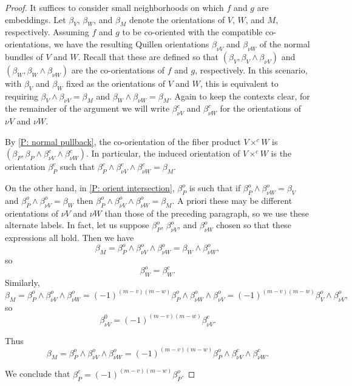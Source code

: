 \begin{proof}
	It suffices to consider small neighborhoods on which $f$ and $g$ are embeddings.
	Let $\beta_V$, $\beta_W$, and $\beta_M$ denote the orientations of $V$, $W$, and $M$, respectively.
	Assuming $f$ and $g$ to be co-oriented with the compatible co-orientations, we have the resulting Quillen orientations $\beta_{\nu V}$ and $\beta_{\nu W}$ of the normal bundles of $V$ and $W$.
	Recall that these are defined so that $(\beta_V,\beta_V \wedge \beta_{\nu V})$ and $(\beta_W,\beta_W \wedge \beta_{\nu W})$ are the co-orientations of $f$ and $g$, respectively.
	In this scenario, with $\beta_V$ and $\beta_W$ fixed as the orientations of $V$ and $W$, this is equivalent to requiring $\beta_V \wedge \beta_{\nu V} = \beta_M$ and $\beta_W \wedge \beta_{\nu W} = \beta_M$.
	Again to keep the contexts clear, for the remainder of the argument we will write $\beta^c_{\nu V}$ and $\beta^c_{\nu W}$ for the orientations of $\nu V$ and $\nu W$.

	By \cref{P: normal pullback}, the co-orientation of the fiber product $V\times^cW$ is $(\beta_P,\beta_P \wedge \beta^c_{\nu V} \wedge \beta^c_{\nu W})$.
	In particular, the induced orientation of $V\times^cW$ is the orientation $\beta_P^c$ such that $\beta_P^c \wedge \beta^c_{\nu V} \wedge \beta^c_{\nu W} = \beta_M$.

	On the other hand, in \cref{P: orient intersection}, $\beta^o_P$ is such that if $\beta^o_P \wedge \beta^o_{\nu W} = \beta_V$ and $\beta^o_P \wedge \beta^o_{\nu V} = \beta_W$ then $\beta^o_P \wedge \beta^o_{\nu V} \wedge \beta^o_{\nu W} = \beta_M.$ A priori these may be different orientations of $\nu V$ and $\nu W$ than those of the preceding paragraph, so we use these alternate labels.
	In fact, let us suppose $\beta^o_P$, $\beta^o_{\nu V}$, and $\beta^o_{\nu W}$ chosen so that these expressions all hold.
	Then we have
	$$\beta_M = \beta^o_P \wedge \beta^o_{\nu V} \wedge \beta^o_{\nu W} = \beta_{W} \wedge \beta^o_{\nu W},$$
	so
	$$\beta_W^o = \beta_W^c.$$
	Similarly,
	$$\beta_M = \beta^o_P \wedge \beta^o_{\nu V} \wedge \beta^o_{\nu W} = (-1)^{(m-v)(m-w)}\beta^o_P \wedge \beta^o_{\nu W} \wedge \beta^o_{\nu V} = (-1)^{(m-v)(m-w)}\beta^o_V \wedge \beta^o_{\nu V},$$
	so
	$$\beta^0_{\nu V} = (-1)^{(m-v)(m-w)}\beta^c_{\nu V}.$$

	Thus
	$$\beta_M = \beta^o_P \wedge \beta^o_{\nu V} \wedge \beta^o_{\nu W} = (-1)^{(m-v)(m-w)}\beta^o_P \wedge \beta^c_{\nu V} \wedge \beta^c_{\nu W}.$$

	We conclude that $\beta^c_P = (-1)^{(m-v)(m-w)}\beta^o_P$.
\end{proof}

